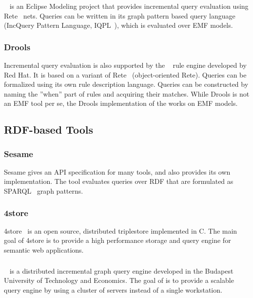 \subsubsection{\eiq}
\eiq~\cite{models10} is an Eclipse Modeling project that provides incremental query evaluation using Rete~\cite{rete} nets. Queries can be written in its graph pattern based query language (IncQuery Pattern Language, IQPL~\cite{iqpl}), which is evaluated over EMF models.

\subsubsection{Drools}
Incremental query evaluation is also supported by the ~\cite{Drools} rule engine developed by Red Hat. It is based on a variant of Rete~\cite{rete} (object-oriented Rete). Queries can be formalized using its own rule description language. Queries can be constructed by naming the ''when'' part of rules and acquiring their matches. While Drools is not an EMF tool per se, the Drools implementation of the \tb{} works on EMF models.


\subsection{RDF-based Tools}

\subsubsection{Sesame}
Sesame gives an API specification for many tools, and also provides its own implementation. The tool evaluates queries over RDF that are formulated as SPARQL~\cite{Sparql} graph patterns.

\subsubsection{4store}
4store~\cite{harris20094store} is an open source, distributed triplestore implemented in C. The main goal of 4store is to provide a high performance storage and query engine for semantic web applications. 

\subsubsection{\iqd}
\iqd~\cite{Izso:2013:IIG:2487766.2487772} is a distributed incremental graph query engine developed in the Budapest University of Technology and Economics. The goal of \iqd is to provide a scalable query engine by using a cluster of servers instead of a single workstation.


